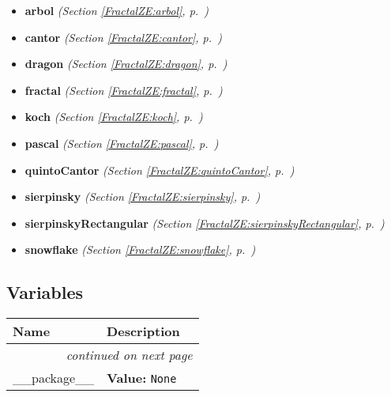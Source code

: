 \begin{itemize}
\setlength{\parskip}{0ex}
\item \textbf{arbol}
  \textit{(Section \ref{FractalZE:arbol}, p.~\pageref{FractalZE:arbol})}

\item \textbf{cantor}
  \textit{(Section \ref{FractalZE:cantor}, p.~\pageref{FractalZE:cantor})}

\item \textbf{dragon}
  \textit{(Section \ref{FractalZE:dragon}, p.~\pageref{FractalZE:dragon})}

\item \textbf{fractal}
  \textit{(Section \ref{FractalZE:fractal}, p.~\pageref{FractalZE:fractal})}

\item \textbf{koch}
  \textit{(Section \ref{FractalZE:koch}, p.~\pageref{FractalZE:koch})}

\item \textbf{pascal}
  \textit{(Section \ref{FractalZE:pascal}, p.~\pageref{FractalZE:pascal})}

\item \textbf{quintoCantor}
  \textit{(Section \ref{FractalZE:quintoCantor}, p.~\pageref{FractalZE:quintoCantor})}

\item \textbf{sierpinsky}
  \textit{(Section \ref{FractalZE:sierpinsky}, p.~\pageref{FractalZE:sierpinsky})}

\item \textbf{sierpinskyRectangular}
  \textit{(Section \ref{FractalZE:sierpinskyRectangular}, p.~\pageref{FractalZE:sierpinskyRectangular})}

\item \textbf{snowflake}
  \textit{(Section \ref{FractalZE:snowflake}, p.~\pageref{FractalZE:snowflake})}

\end{itemize}



  \subsection{Variables}

    \vspace{-1cm}
\hspace{\varindent}\begin{longtable}{|p{\varnamewidth}|p{\vardescrwidth}|l}
\cline{1-2}
\cline{1-2} \centering \textbf{Name} & \centering \textbf{Description}& \\
\cline{1-2}
\endhead\cline{1-2}\multicolumn{3}{r}{\small\textit{continued on next page}}\\\endfoot\cline{1-2}
\endlastfoot\raggedright \_\-\_\-p\-a\-c\-k\-a\-g\-e\-\_\-\_\- & \raggedright \textbf{Value:} 
{\tt None}&\\
\cline{1-2}
\end{longtable}

